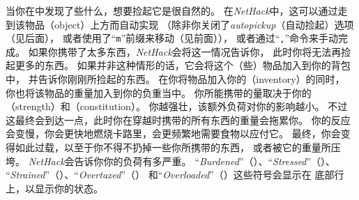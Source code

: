 \documentclass[a4paper, 10pt]{article}
\begin{document}
当你在\zhTransDungeon{}中发现了些什么，想要捡起它是很自然的。
在{\it NetHack}中，这可以通过走到该物品（object）上方而自动实现
（除非你关闭了{\it autopickup\/}（自动捡起）选项（见后面），
或者使用了“{\tt m}”前缀来移动（见前面）），
或者通过“{\tt ,}”命令来手动完成。
如果你携带了太多东西，{\it NetHack\/}会将这一情况告诉你，
此时你将无法再捡起更多的东西。
如果并非这种情形的话，它会将这个（些）物品加入到你的背包中，
并告诉你刚刚所捡起的东西。
在你将物品加入你的\zhTransInventory{}（inventory）的同时，
你也将该物品的重量加入到你的负重当中。
你所能携带的量取决于你的\zhTransStrength{}（strength）和\zhTransConstitution（constitution）。
你越强壮，该额外负荷对你的影响越小。
不过这最终会到达一点，此时你在穿越\zhTransDungeon{}时携带的所有东西的重量会拖累你。
你的反应会变慢，你会更快地燃烧卡路里，会更频繁地需要食物以应付它。
最终，你会变得如此过载，以至于你不得不扔掉一些你所携带的东西，
或者被它的重量所压垮。
{\it NetHack\/}会告诉你你的负荷有多严重。
“{\it Burdened}”（\zhTransBurdened）、“{\it Stressed}”（\zhTransStressed）、
“{\it Strained}”（\zhTransStrained）、“{\it Overtaxed}”（\zhTransOvertaxed）
和“{\it Overloaded}”（\zhTransOverloaded）这些符号会显示在
底部行上，以显示你的状态。
\end{document}
